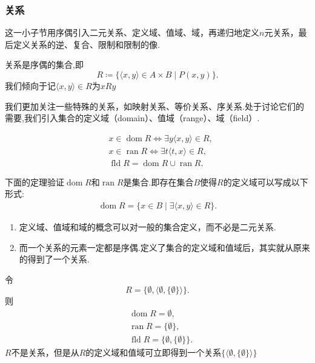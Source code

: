 \subsubsection{关系}

这一小子节用序偶引入二元关系、定义域、值域、域，再递归地定义$n$元关系，最后定义关系的逆、复合、限制和限制的像.

\begin{definition}
    [二元关系]
    关系是序偶的集合,即
    \[R\coloneq\{\langle x,y\rangle\in A\times B\mid P(x,y)\}.\]
    我们倾向于记$\langle x,y\rangle\in R$为$xRy$
\end{definition}

我们更加关注一些特殊的关系，如映射关系、等价关系、序关系.处于讨论它们的需要,我们引入集合的定义域（domain）、值域（range）、域（field）.

\begin{definition}
    [集合的定义域、值域、域]
    \begin{align*}
        &x\in\operatorname{dom}R\iff\exists y\langle x,y\rangle\in R,\\
        &x\in\operatorname{ran}R\iff\exists t\langle t,x\rangle\in R,\\
        &\operatorname{fld}R=\operatorname{dom}R\cup\operatorname{ran}R.
    \end{align*}
\end{definition}

下面的定理验证$\operatorname{dom}R$和$\operatorname{ran}R$是集合.即存在集合$B$使得$R$的定义域可以写成以下形式:
\begin{align*}
    \operatorname{dom}R=\{x\in B\mid \exists \langle x,y \rangle \in R\}.
\end{align*}

\begin{note}
    \begin{enumerate}
        \item 定义域、值域和域的概念可以对一般的集合定义，而不必是二元关系.
        \item 而一个关系的元素一定都是序偶.定义了集合的定义域和值域后，其实就从原来的得到了一个关系.
    \end{enumerate}
\end{note}

\begin{example}
    令
    \[R=\{{\emptyset,\langle \emptyset,\{\emptyset\}\rangle}\}.\]
    则
    \begin{align*}
        &\operatorname{dom}R=\emptyset,\\
        &\operatorname{ran}R=\{\emptyset\},\\
        &\operatorname{fld}R=\{\emptyset,\{\emptyset\}\}.
    \end{align*}
    $R$不是关系，但是从$R$的定义域和值域可立即得到一个关系$\{\langle\emptyset,\{\emptyset\}\rangle\}$
\end{example}

